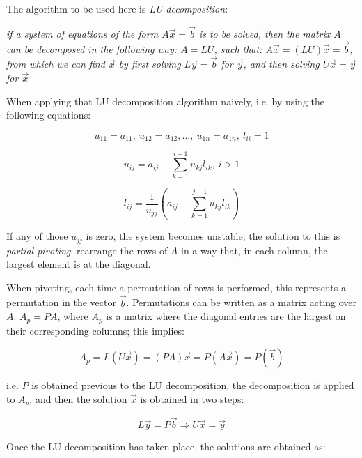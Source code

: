 \documentclass[paper=a4, fontsize=11pt]{scrartcl} %
\numberwithin{equation}{section} %
\numberwithin{figure}{section} %
\numberwithin{table}{section} %
\begin{document}
The algorithm to be used here is \textit{LU decomposition}:

\begin{center}
\textit{if a system of equations of the form $A\vec{x} = \vec{b}$ is to be solved, then the matrix $A$ can be decomposed in the following way: $A = LU$, such that: $A\vec{x} = (LU)\vec{x} = \vec{b}$, from which we can find $\vec{x}$ by first solving $L\vec{y} = \vec{b}$ for $\vec{y}$, and then solving $U\vec{x} = \vec{y}$ for $\vec{x}$}
\end{center}

When applying that LU decomposition algorithm naively, i.e. by using the following equations:

\begin{equation}
u_{11} = a_{11}, \ u_{12} = a_{12},..., \ u_{1n} = a_{1n}, \ l_{ii} = 1
\end{equation}

\begin{equation}
u_{ij} = a_{ij}-\sum_{k=1}^{i-1}u_{kj}l_{ik}, \ i>1
\end{equation}

\begin{equation}
l_{ij} = \frac{1}{u_{jj}} \left( a_{ij}-\sum_{k=1}^{j-1}u_{kj}l_{ik} \right)
\end{equation}

If any of those $u_{jj}$ is zero, the system becomes unstable; the solution to this is \textit{partial pivoting}: rearrange the rows of $A$ in a way that, in each column, the largest element is at the diagonal.

When pivoting, each time a permutation of rows is performed, this represents a permutation in the vector $\vec{b}$. Permutations can be written as a matrix acting over $A$: $A_{p} = PA$, where $A_{p}$ is a matrix where the diagonal entries are the largest on their corresponding columns; this implies:

\begin{equation}
A_{p} =L(U\vec{x})= (PA)\vec{x} = P(A\vec{x}) = P(\vec{b})
\end{equation}

i.e. $P$ is obtained previous to the LU decomposition, the decomposition is applied to $A_{p}$, and then the solution $\vec{x}$ is obtained in two steps:

\begin{equation}
L\vec{y} = P\vec{b} \Rightarrow U\vec{x} = \vec{y}
\end{equation}

Once the LU decomposition has taken place, the solutions are obtained as:
\end{document}
